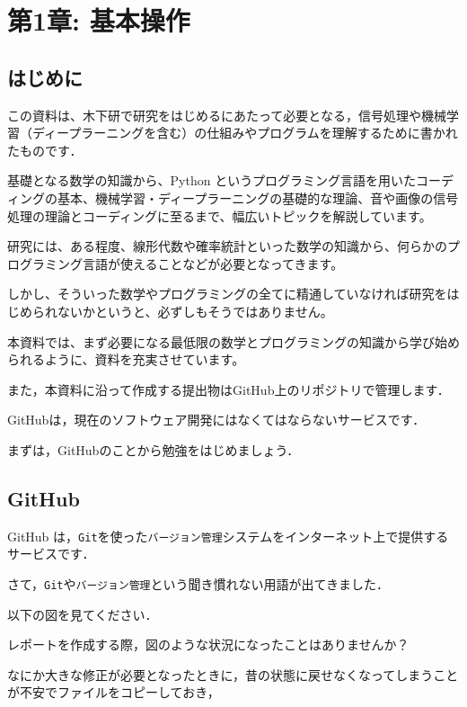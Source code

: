 \chapter{第1章: 基本操作}


\section{はじめに}

この資料は、木下研で研究をはじめるにあたって必要となる，信号処理や機械学習（ディープラーニングを含む）の仕組みやプログラムを理解するために書かれたものです．


基礎となる数学の知識から、Python というプログラミング言語を用いたコーディングの基本、機械学習・ディープラーニングの基礎的な理論、音や画像の信号処理の理論とコーディングに至るまで、幅広いトピックを解説しています。


研究には、ある程度、線形代数や確率統計といった数学の知識から、何らかのプログラミング言語が使えることなどが必要となってきます。

しかし、そういった数学やプログラミングの全てに精通していなければ研究をはじめられないかというと、必ずしもそうではありません。


本資料では、まず必要になる最低限の数学とプログラミングの知識から学び始められるように、資料を充実させています。

また，本資料に沿って作成する提出物はGitHub上のリポジトリで管理します．


GitHubは，現在のソフトウェア開発にはなくてはならないサービスです．

まずは，GitHubのことから勉強をはじめましょう．


\section{GitHub}

GitHub は，\texttt{Git}を使った\texttt{バージョン管理}システムをインターネット上で提供するサービスです．

さて，\texttt{Git}や\texttt{バージョン管理}という聞き慣れない用語が出てきました．


以下の図を見てください．




レポートを作成する際，図のような状況になったことはありませんか？

なにか大きな修正が必要となったときに，昔の状態に戻せなくなってしまうことが不安でファイルをコピーしておき，

